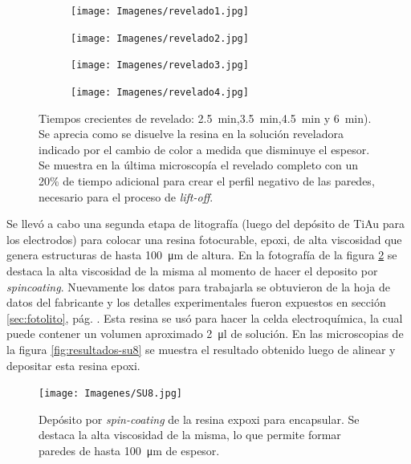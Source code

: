 { 				%
 				\begin{figure}[th!]
			 	   	    \centering
			 	   	    \begin{subfigure}[t]{0.495\textwidth}
			        	\texttt{[image: Imagenes/revelado1.jpg]}
			       		\end{subfigure}
			     		\begin{subfigure}[t]{0.495\textwidth}
			     		\texttt{[image: Imagenes/revelado2.jpg]}
			    		\end{subfigure}
			     		\begin{subfigure}[t]{0.495\textwidth}
						\vspace*{-0.3cm}
			     		\texttt{[image: Imagenes/revelado3.jpg]}
			        	\end{subfigure}
						\begin{subfigure}[t]{0.495\textwidth}
			     		\vspace*{-0.3cm}
			     		\texttt{[image: Imagenes/revelado4.jpg]}
			        	\end{subfigure}
			     		\caption[Revelado en función del tiempo]{Tiempos crecientes de revelado: \SI{2.5}{min},\SI{3.5}{min},\SI{4.5}{min} y \SI{6}{min}). Se aprecia como se disuelve la resina en la solución reveladora indicado por el cambio de color a medida que disminuye el espesor. Se muestra en la última microscopía el revelado completo con un 20\% de tiempo adicional para crear el perfil negativo de las paredes, necesario para el proceso de\textit{ lift-off}.}
			     		\label{fig:revelado}
			     	   	\end{figure}

 		      Se llevó a cabo una segunda etapa de litografía (luego del depósito de Ti\textbar Au para los electrodos) para colocar una resina fotocurable, epoxi, de alta viscosidad que genera estructuras de hasta \SI{100}{\um} de altura. En la fotografía de la figura \ref{fig:su8} se destaca la alta viscosidad de la misma al momento de hacer el deposito por \textit{spincoating}. Nuevamente los datos para trabajarla se obtuvieron de la hoja de datos del fabricante\cite{Su8,Microchemicals2014} y los detalles experimentales fueron expuestos en  sección \ref{sec:fotolito}, pág. \pageref{sec:fotolito}. Esta resina se usó para hacer la celda electroquímica, la cual puede contener un volumen aproximado \SI{2}{\ul} de solución. En las microscopias de la figura \ref{fig:resultados-su8} se muestra el resultado obtenido luego de alinear y depositar esta resina epoxi.

 				\begin{figure}[h!]
 				\centering
 				\texttt{[image: Imagenes/SU8.jpg]}
 				\caption[Depósito de la resina epoxi SU8]{Depósito por \textit{spin-coating }de la resina expoxi para encapsular. Se destaca la alta viscosidad de la misma, lo que permite formar paredes de hasta \SI{100}{\um} de espesor.}
 				\label{fig:su8}
 				\end{figure}

}
